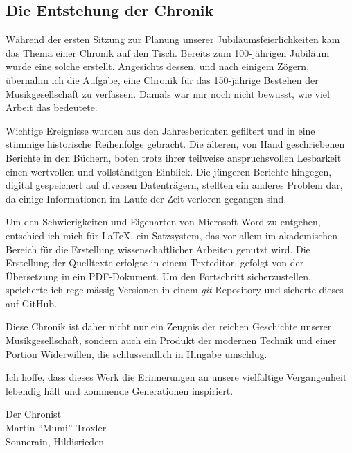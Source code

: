 
\cleardoublepage

\begin{multicols*}{2}

    \vphantom{1em}
    \vfill
    \columnbreak

    \section*{Die Entstehung der Chronik}

    Während der ersten Sitzung zur Planung unserer Jubiläumsfeierlichkeiten kam
    das Thema einer Chronik auf den Tisch. Bereits zum 100-jährigen Jubiläum
    wurde eine solche erstellt. Angesichts dessen, und nach einigem Zögern,
    übernahm ich die Aufgabe, eine Chronik für das 150-jährige Bestehen der
    Musikgesellschaft zu verfassen. Damals war mir noch nicht bewusst, wie viel
    Arbeit das bedeutete.

    Wichtige Ereignisse wurden aus den Jahresberichten gefiltert und in eine
    stimmige historische Reihenfolge gebracht. Die älteren, von Hand
    geschriebenen Berichte in den Büchern, boten trotz ihrer teilweise
    anspruchsvollen Lesbarkeit einen wertvollen und vollständigen Einblick. Die
    jüngeren Berichte hingegen, digital gespeichert auf diversen Datenträgern,
    stellten ein anderes Problem dar, da einige Informationen im Laufe der Zeit
    verloren gegangen sind.

    \bigskip

    Um den Schwierigkeiten und Eigenarten von Microsoft Word zu entgehen,
    entschied ich mich für \LaTeX, ein Satzsystem, das vor allem im akademischen
    Bereich für die Erstellung wissenschaftlicher Arbeiten genutzt wird. Die
    Erstellung der Quelltexte erfolgte in einem Texteditor, gefolgt von der
    Übersetzung in ein PDF-Dokument. Um den Fortschritt sicherzustellen,
    speicherte ich regelmässig Versionen in einem \emph{git} Repository und sicherte
    dieses auf GitHub.

    \bigskip

    Diese Chronik ist daher nicht nur ein Zeugnis der reichen Geschichte unserer
    Musikgesellschaft, sondern auch ein Produkt der modernen Technik und einer
    Portion Widerwillen, die schlussendlich in Hingabe umschlug.

    \bigskip

    Ich hoffe, dass dieses Werk die Erinnerungen an unsere vielfältige
    Vergangenheit lebendig hält und kommende Generationen inspiriert.

    \bigskip

    \raggedleft Der Chronist\\
    \raggedleft Martin \enquote{Mumi} Troxler\\
    \raggedleft Sonnerain, Hildisrieden\\

\end{multicols*}

